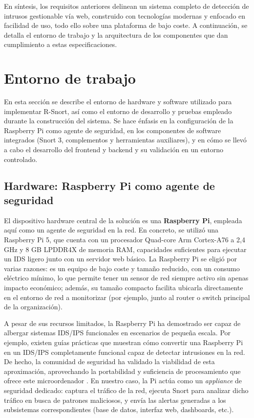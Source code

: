 \documentclass[11pt,a4paper,twoside]{report}
\begin{document}
En síntesis, los requisitos anteriores delinean un sistema completo de detección de intrusos gestionable vía web, construido con tecnologías modernas y enfocado en facilidad de uso, todo ello sobre una plataforma de bajo coste. A continuación, se detalla el entorno de trabajo y la arquitectura de los componentes que dan cumplimiento a estas especificaciones.\newline

\section{Entorno de trabajo}
En esta sección se describe el entorno de hardware y software utilizado para implementar R-Snort, así como el entorno de desarrollo y pruebas empleado durante la construcción del sistema. Se hace énfasis en la configuración de la Raspberry Pi como agente de seguridad, en los componentes de software integrados (Snort 3, complementos y herramientas auxiliares), y en cómo se llevó a cabo el desarrollo del frontend y backend y su validación en un entorno controlado.\newline

\subsection{Hardware: Raspberry Pi como agente de seguridad}
El dispositivo hardware central de la solución es una \textbf{Raspberry Pi}, empleada aquí como un agente de seguridad en la red. En concreto, se utilizó una Raspberry Pi 5, que cuenta con un procesador Quad-core Arm Cortex-A76 a 2,4 GHz y 8 GB LPDDR4X de memoria RAM, capacidades suficientes para ejecutar un IDS ligero junto con un servidor web básico. La Raspberry Pi se eligió por varias razones: es un equipo de bajo coste y tamaño reducido, con un consumo eléctrico mínimo, lo que permite tener un sensor de red siempre activo sin apenas impacto económico; además, su tamaño compacto facilita ubicarla directamente en el entorno de red a monitorizar (por ejemplo, junto al router o switch principal de la organización).\newline

A pesar de sus recursos limitados, la Raspberry Pi ha demostrado ser capaz de albergar sistemas IDS/IPS funcionales en escenarios de pequeña escala. Por ejemplo, existen guías prácticas que muestran cómo convertir una Raspberry Pi en un IDS/IPS completamente funcional capaz de detectar intrusiones en la red. De hecho, la comunidad de seguridad ha validado la viabilidad de esta aproximación, aprovechando la portabilidad y suficiencia de procesamiento que ofrece este microordenador \cite{SecMaster2024}. En nuestro caso, la Pi actúa como un \emph{appliance} de seguridad dedicado: captura el tráfico de la red, ejecuta Snort para analizar dicho tráfico en busca de patrones maliciosos, y envía las alertas generadas a los subsistemas correspondientes (base de datos, interfaz web, dashboards, etc.).\newline
\end{document}
